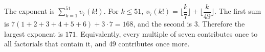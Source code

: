 The exponent is $\sum_{k=1}^{51}v_7(k!)$. For $k\le51$, $v_7 (k!) = \lfloor \dfrac{k}{7} \rfloor + \lfloor \dfrac{k}{49} \rfloor$. The first sum is $7(1+2+3+4+5+6)+3\cdot7=168$, and the second is $3$. Therefore the largest exponent is $\boxed{171}$. Equivalently, every multiple of seven contributes once to all factorials that contain it, and 49 contributes once more.
